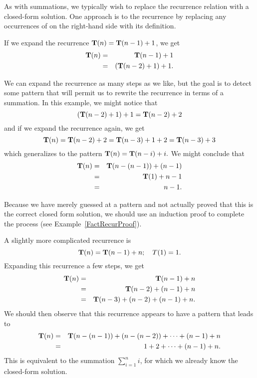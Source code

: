 As with summations, we typically wish to replace the recurrence
relation with a closed-form solution.
One approach is to  the recurrence by replacing any
occurrences of  on the right-hand side with its definition.

\begin{example}
\label{FactRecurSol}
If we expand the recurrence \(\mbox{$\textbf{T}(n)$} = \mbox{$\textbf{T}(n-1)$} + 1\), we get 
\begin{eqnarray*}
\mbox{$\textbf{T}(n)$} &=& \mbox{$\textbf{T}(n-1)$} + 1\\
&=& ({\textbf{T}}(n-2) + 1) + 1.\\
\end{eqnarray*}

We can expand the recurrence as many steps as we like, but the goal is 
to detect some pattern that will permit us to rewrite the recurrence
in terms of a summation.
In this example, we might notice that
\[({\textbf{T}}(n-2) + 1) + 1 = {\textbf{T}}(n-2) + 2\]
\noindent and if we expand the recurrence again, we get
\[\mbox{$\textbf{T}(n)$} = {\textbf{T}}(n-2) + 2 = {\textbf{T}}(n-3) + 1 + 2 = {\textbf{T}}(n-3) + 3\]
\noindent which generalizes to the pattern \(\mbox{$\textbf{T}(n)$} = {\textbf{T}}(n-i) + i.\)
We might conclude that
\begin{eqnarray*}
\mbox{$\textbf{T}(n)$} &=& {\textbf{T}}(n - (n-1)) + (n - 1)\\
&=& {\textbf{T}}(1) + n-1\\
&=& n-1.
\end{eqnarray*}

Because we have merely guessed at a pattern and not actually proved
that this is the correct closed form solution, we should use an
induction proof to complete the process
(see Example~\ref{FactRecurProof}). 
\end{example}

\begin{example}
A slightly more complicated recurrence is
\[\mbox{$\textbf{T}(n)$} = \mbox{$\textbf{T}(n-1)$} + n; \quad T(1) = 1.\]
Expanding this recurrence a few steps, we get
\begin{eqnarray*}
\mbox{$\textbf{T}(n)$} &=& \mbox{$\textbf{T}(n-1)$} + n\\
&=& {\textbf{T}}(n-2) + (n-1) + n\\
&=& {\textbf{T}}(n-3) + (n-2) + (n-1) + n.\\
\end{eqnarray*}
We should then observe that this recurrence appears to have a pattern
that leads to
\begin{eqnarray*}
\mbox{$\textbf{T}(n)$} &=& {\textbf{T}}(n-(n-1)) + (n-(n-2)) + \cdots + (n-1) + n\\
&=& 1 + 2 + \cdots + (n-1) + n.
\end{eqnarray*}
This is equivalent to the summation \(\sum_{i=1}^n i\), for which we
already know the closed-form solution.
\end{example}

